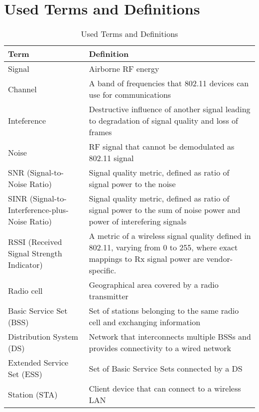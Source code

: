 \appendix
\makeatletter
\let\@currsize\normalsize
\makeatother
\chapter{Used Terms and Definitions}

\begin{longtable}{|p{6cm}|p{10cm}|}
\caption{Used Terms and Definitions}
\label{appx:table:defs_table} \\
    \hline
    \textbf{Term} & \textbf{Definition} \\ \hline
    Signal & Airborne RF energy \cite{colemanCWNACertifiedWireless2021} \\
    \hline
    Channel & A band of frequencies that 802.11 devices can use for communications \cite{AuthoritativeDictionaryIEEE2000} \\
    \hline
    Inteference & Destructive influence of another signal leading to degradation of signal quality and loss of frames \\
    \hline
    Noise & RF signal that cannot be demodulated as 802.11 signal \\
    \hline
    SNR (Signal-to-Noise Ratio) & Signal quality metric, defined as ratio of signal power to the noise \\
    \hline
    SINR (Signal-to-Interference-plus-Noise Ratio) & Signal quality metric, defined as ratio of signal power to the sum of noise power and power of interefering signals \\
    \hline
    RSSI (Received Signal Strength Indicator) & A metric of a wireless signal quality defined in 802.11, varying from 0 to 255, where exact mappings to Rx signal power are vendor-specific. \\
    \hline
    Radio cell & Geographical area covered by a radio transmitter \cite{tanenbaumComputerNetworks2020} \\
    \hline
    Basic Service Set (BSS) & Set of stations belonging to the same radio cell and exchanging information \cite{konsgenSpectrumManagementAlgorithms2010} \\
    \hline
    Distribution System (DS) & Network that interconnects multiple BSSs and provides connectivity to a wired network \cite{konsgenSpectrumManagementAlgorithms2010} \\
    \hline
    Extended Service Set (ESS) & Set of Basic Service Sets connected by a DS \cite{konsgenSpectrumManagementAlgorithms2010} \\
    \hline
    Station (STA) & Client device that can connect to a wireless LAN \\

\end{longtable}
